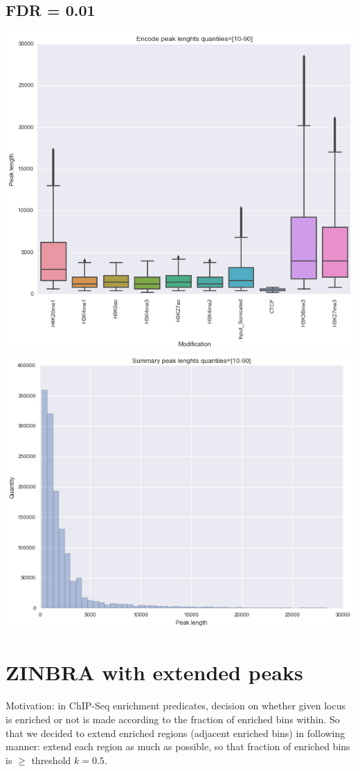 \documentclass{article}
\begin{document}
\subsection{FDR = 0.01}
\includegraphics[width=0.5\linewidth]{zinbra1e2.png}
\includegraphics[width=0.5\linewidth]{zinbra1e22.png}

\section{ZINBRA with extended peaks}
Motivation: in ChIP-Seq enrichment predicates, decision on whether given locus is enriched or not is made according to the fraction of enriched bins within. So that we decided to extend enriched regions (adjacent enriched bins) in following manner: extend each region as much as possible, so that fraction of enriched bins is $\geq$ threshold $k=0.5$. 
\end{document}
